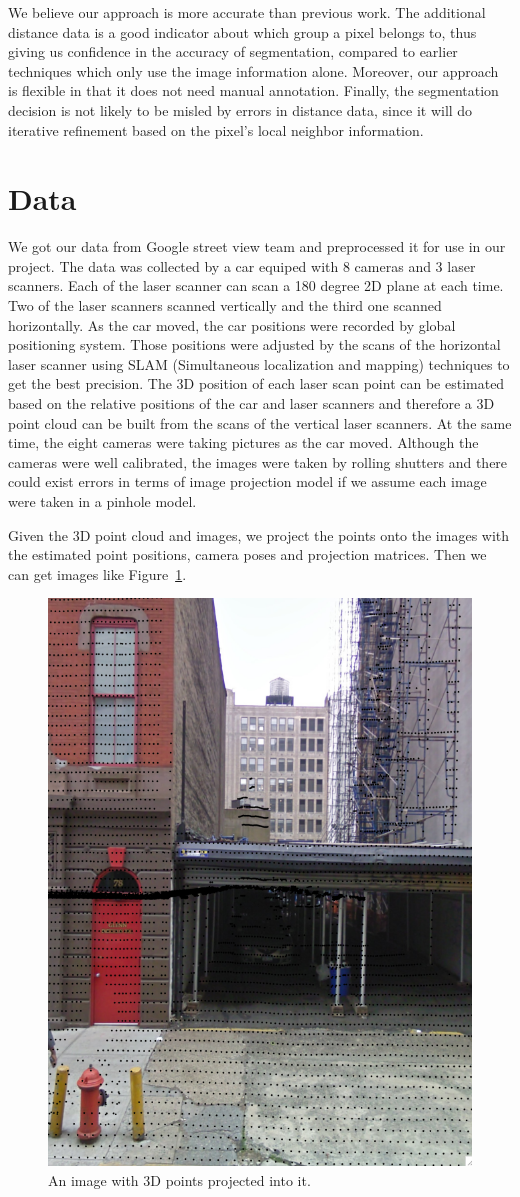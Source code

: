 \documentclass{article} %
\begin{document}
We believe our approach is more accurate than previous work. The additional 
distance data is a good indicator about which group a pixel belongs to, 
thus giving us confidence in the accuracy of segmentation, compared to earlier
 techniques which only use the image information alone. Moreover, our
 approach is flexible in that it does not need manual annotation. Finally, the
segmentation decision is not likely to be misled by errors in distance
data, since it will do iterative refinement based on the pixel's local
neighbor information.

\section{Data}
We got our data from Google street view team and preprocessed it for
use in our project. The data was collected by a car equiped
with 8 cameras and 3 laser scanners. Each of the laser scanner can
scan a 180 degree 2D plane at each time. Two of the laser scanners
scanned vertically and the third one scanned horizontally. As the car moved, the car
positions were recorded by global positioning system. Those positions
were adjusted by the scans of the horizontal laser scanner using SLAM
(Simultaneous localization and mapping) techniques to get the best
precision. The 3D position of each laser scan point can be
estimated based on the relative positions of the car and laser
scanners and therefore a 3D point cloud can be built from the scans of
the vertical laser scanners. At the same time, the eight
cameras were taking pictures as the car moved. Although the cameras
were well calibrated, the images were taken by rolling shutters and
there could exist errors in terms of image projection model if we assume each
image were taken in a pinhole model.

Given the 3D point cloud and images, we project the points onto the
images with the estimated point positions, camera poses and projection
matrices. Then we can get images like Figure~\ref{fig-data_image}.

\begin{figure}[h]
\begin{center}
\includegraphics[height=0.5\linewidth]{./fig/image_sample.png}
\end{center}
\caption{An image with 3D points projected into it.}
\label{fig-data_image}
\end{figure}
\end{document}
